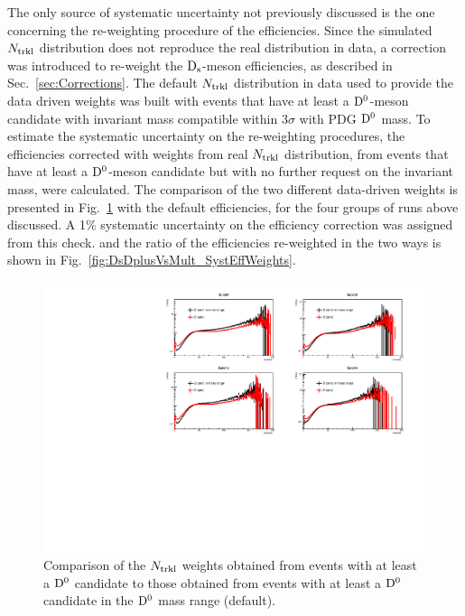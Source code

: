 The only source of systematic uncertainty not previously discussed 
is the one concerning the re-weighting procedure of the efficiencies.  
Since the simulated $N_{\rm trkl}$ distribution does not reproduce the real distribution in data, 
a correction was introduced to re-weight the ${\rm D_s}$-meson efficiencies, as described 
in Sec.~\ref{sec:Corrections}. 
The default $N_{\rm trkl}$ distribution in data used to provide the data driven weights
was built with events that have at least a ${\rm D^0}$-meson candidate
with invariant mass compatible within 3$\sigma$ with PDG ${\rm D^0}$ mass.
To estimate the systematic uncertainty on the re-weighting procedures,
the efficiencies corrected with weights from real $N_{\rm trkl}$ distribution, from events that have at 
least a ${\rm D^0}$-meson candidate but with no further request on the invariant mass,
were calculated. The comparison of the two different data-driven weights 
is presented in Fig.~\ref{fig:NtrklWeights_EvWithD_EvWithCand_Comparison} 
with the default efficiencies, for the four groups of runs above discussed.
 A 1\% systematic uncertainty on the efficiency correction was assigned from this check. 
and the ratio of the efficiencies re-weighted in the two ways is shown in Fig.~\ref{fig:DsDplusVsMult_SystEffWeights}.

\begin{figure}[htpb]
\centering
 \includegraphics[width=.9\textwidth]{FigCap6/NtrkWeightsD-Cand_4Bunches_DsDplusVsmult.pdf}
 \caption{Comparison of the $N_{\rm trkl}$ weights obtained from events with at least a ${\rm D^0}$ candidate to those obtained from events with at least a ${\rm D^0}$ candidate in the ${\rm D^0}$ mass range (default).}
 \label{fig:NtrklWeights_EvWithD_EvWithCand_Comparison}
\end{figure}


